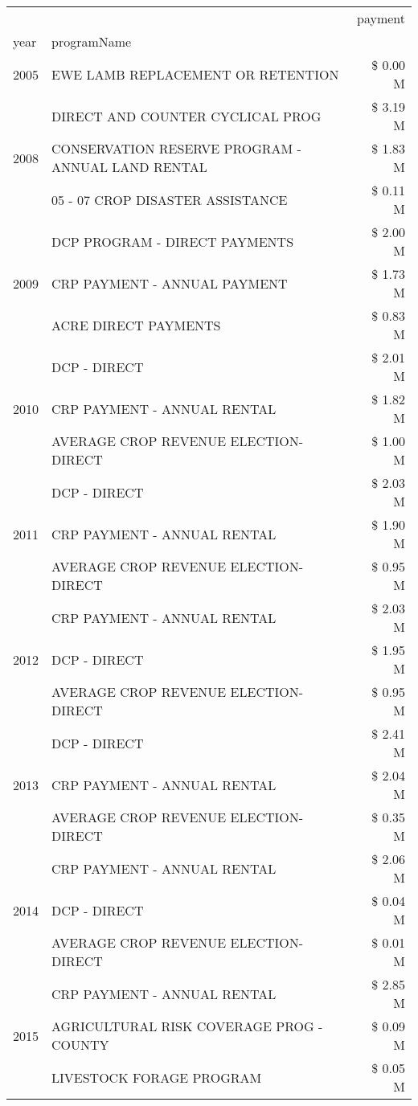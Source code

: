 \begin{tabular}{llr}
\toprule
 &  & payment \\
year & programName &  \\
\midrule
2005 & EWE LAMB REPLACEMENT OR RETENTION & \$ 0.00 M \\
\cline{1-3}
\multirow[t]{3}{*}{2008} & DIRECT AND COUNTER CYCLICAL PROG & \$ 3.19 M \\
 & CONSERVATION RESERVE PROGRAM - ANNUAL LAND RENTAL & \$ 1.83 M \\
 & 05 - 07 CROP DISASTER ASSISTANCE & \$ 0.11 M \\
\cline{1-3}
\multirow[t]{3}{*}{2009} & DCP PROGRAM - DIRECT PAYMENTS & \$ 2.00 M \\
 & CRP PAYMENT - ANNUAL PAYMENT & \$ 1.73 M \\
 & ACRE DIRECT PAYMENTS & \$ 0.83 M \\
\cline{1-3}
\multirow[t]{3}{*}{2010} & DCP - DIRECT & \$ 2.01 M \\
 & CRP PAYMENT - ANNUAL RENTAL & \$ 1.82 M \\
 & AVERAGE CROP REVENUE ELECTION-DIRECT & \$ 1.00 M \\
\cline{1-3}
\multirow[t]{3}{*}{2011} & DCP - DIRECT & \$ 2.03 M \\
 & CRP PAYMENT - ANNUAL RENTAL & \$ 1.90 M \\
 & AVERAGE CROP REVENUE ELECTION-DIRECT & \$ 0.95 M \\
\cline{1-3}
\multirow[t]{3}{*}{2012} & CRP PAYMENT - ANNUAL RENTAL & \$ 2.03 M \\
 & DCP - DIRECT & \$ 1.95 M \\
 & AVERAGE CROP REVENUE ELECTION-DIRECT & \$ 0.95 M \\
\cline{1-3}
\multirow[t]{3}{*}{2013} & DCP - DIRECT & \$ 2.41 M \\
 & CRP PAYMENT - ANNUAL RENTAL & \$ 2.04 M \\
 & AVERAGE CROP REVENUE ELECTION-DIRECT & \$ 0.35 M \\
\cline{1-3}
\multirow[t]{3}{*}{2014} & CRP PAYMENT - ANNUAL RENTAL & \$ 2.06 M \\
 & DCP - DIRECT & \$ 0.04 M \\
 & AVERAGE CROP REVENUE ELECTION-DIRECT & \$ 0.01 M \\
\cline{1-3}
\multirow[t]{3}{*}{2015} & CRP PAYMENT - ANNUAL RENTAL & \$ 2.85 M \\
 & AGRICULTURAL RISK COVERAGE PROG - COUNTY & \$ 0.09 M \\
 & LIVESTOCK FORAGE PROGRAM & \$ 0.05 M \\

\end{tabular}
